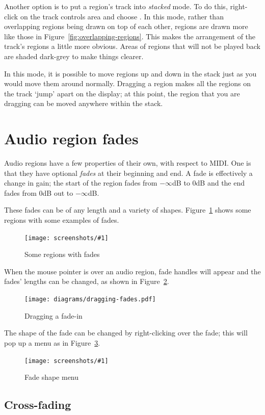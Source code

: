 \documentclass[10pt,a4paper]{book}
\newcommand{\menu}[1]{\emph{\StrSubstitute{#1}{,}{ $\rightarrow$ }}}
\newcommand{\screenshot}[3]{%
\begin{figure}[ht]%
\begin{center}
\texttt{[image: screenshots/\#1]}
\end{center}
\caption{#2}
\label{#3}
\end{figure}}
\begin{document}
{Another option is to put a region's track into \emph{stacked} mode.
To do this, right-click on the track controls area and choose
\menu{Layers,Stacked}.  In this mode, rather than overlapping regions
being drawn on top of each other, regions are drawn more like those in
Figure~\ref{fig:overlapping-regions}.  This makes the arrangement of
the track's regions a little more obvious.  Areas of regions that will
not be played back are shaded dark-grey to make things clearer.

In this mode, it is possible to move regions up and down in the stack
just as you would move them around normally.  Dragging a region makes
all the regions on the track `jump' apart on the display; at this
point, the region that you are dragging can be moved anywhere within
the stack.



\section{Audio region fades}

Audio regions have a few properties of their own, with respect to
MIDI\@.  One is that they have optional \emph{fades} at their
beginning and end.  A fade is effectively a change in gain; the start
of the region fades from $-\infty$dB to $0$dB and the end fades from
$0$dB out to $-\infty$dB.  

These fades can be of any length and a variety of shapes.
Figure~\ref{fig:region-fades} shows some regions with some examples of fades.

\screenshot{region-fades.png}{Some regions with fades}{fig:region-fades}

When the mouse pointer is over an audio region, fade handles will
appear and the fades' lengths can be changed, as shown in
Figure~\ref{fig:dragging-fades}.

\begin{figure}[ht]
\begin{center}
\texttt{[image: diagrams/dragging-fades.pdf]}
\end{center}
\caption{Dragging a fade-in}
\label{fig:dragging-fades}
\end{figure}

The shape of the fade can be changed by right-clicking over the fade;
this will pop up a menu as in Figure~\ref{fig:fades-menu}.

\screenshot{fades-menu.png}{Fade shape menu}{fig:fades-menu}


\subsection{Cross-fading}

}
\end{document}
